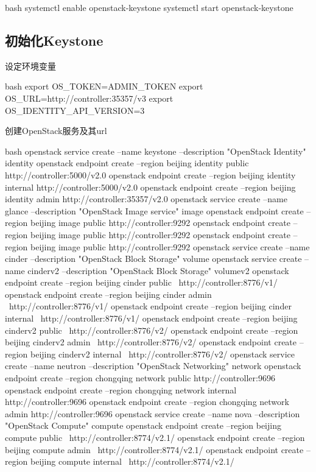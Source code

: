 \begin{code-block}{bash}
systemctl enable openstack-keystone
systemctl start openstack-keystone
\end{code-block}

\subsection{初始化Keystone}
设定环境变量

\begin{code-block}{bash}
export OS_TOKEN=ADMIN_TOKEN
export OS_URL=http://controller:35357/v3
export OS_IDENTITY_API_VERSION=3
\end{code-block}

创建OpenStack服务及其url

\begin{long-block}{bash}
openstack service create --name keystone --description "OpenStack Identity" identity
openstack endpoint create --region beijing identity public http://controller:5000/v2.0
openstack endpoint create --region beijing identity internal http://controller:5000/v2.0
openstack endpoint create --region beijing identity admin http://controller:35357/v2.0
openstack service create --name glance --description "OpenStack Image service" image
openstack endpoint create --region beijing  image public http://controller:9292
openstack endpoint create --region beijing  image public http://controller:9292
openstack endpoint create --region beijing  image public http://controller:9292
openstack service create --name cinder --description "OpenStack Block Storage" volume
openstack service create --name cinderv2 --description "OpenStack Block Storage" volumev2
openstack endpoint create --region beijing cinder public \
    http://controller:8776/v1/%
openstack endpoint create --region beijing cinder admin \
    http://controller:8776/v1/%
openstack endpoint create --region beijing cinder internal \
    http://controller:8776/v1/%
openstack endpoint create --region beijing cinderv2 public \
    http://controller:8776/v2/%
openstack endpoint create --region beijing cinderv2 admin \
    http://controller:8776/v2/%
openstack endpoint create --region beijing cinderv2 internal \
    http://controller:8776/v2/%
openstack service create --name neutron  --description "OpenStack Networking" network
openstack endpoint create --region chongqing network public http://controller:9696
openstack endpoint create --region chongqing network internal http://controller:9696
openstack endpoint create --region chongqing network admin http://controller:9696
openstack service create --name nova --description "OpenStack Compute" compute 
openstack endpoint create --region beijing compute public \
    http://controller:8774/v2.1/%
openstack endpoint create --region beijing compute admin \
    http://controller:8774/v2.1/%
openstack endpoint create --region beijing compute internal \
    http://controller:8774/v2.1/%
\end{long-block}

